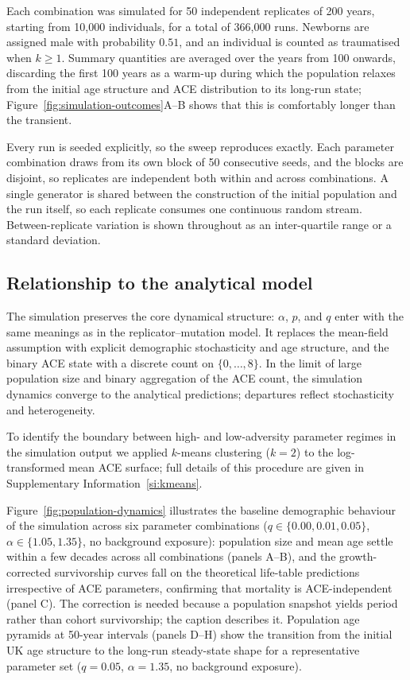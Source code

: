 \documentclass{article}
\begin{document}
Each combination was simulated for 50 independent replicates of 200 years,
starting from 10{,}000 individuals, for a total of 366{,}000 runs.  Newborns are
assigned male with probability \(0.51\), and an individual is counted as
traumatised when \(k \geq 1\).  Summary quantities are averaged over the years
from 100 onwards, discarding the first 100 years as a warm-up during which the
population relaxes from the initial age structure and ACE distribution to its
long-run state; Figure~\ref{fig:simulation-outcomes}A--B shows that
this is comfortably longer than the transient.

Every run is seeded explicitly, so the sweep reproduces exactly.  Each
parameter combination draws from its own block of 50 consecutive seeds, and the
blocks are disjoint, so replicates are independent both within and across
combinations.  A single generator is shared between the construction of the
initial population and the run itself, so each replicate consumes one
continuous random stream.  Between-replicate variation is shown throughout as
an inter-quartile range or a standard deviation.

\subsection*{Relationship to the analytical model}

The simulation preserves the core dynamical structure: \(\alpha\), \(p\), and
\(q\) enter with the same meanings as in the replicator--mutation model. It
replaces the mean-field assumption with explicit demographic stochasticity and
age structure, and the binary ACE state with a discrete count on
\(\{0, \dots, 8\}\).  In the limit of large population size and binary
aggregation of the ACE count, the simulation dynamics converge to the analytical
predictions; departures reflect stochasticity and heterogeneity.

To identify the boundary between high- and low-adversity parameter regimes in
the simulation output we applied \(k\)-means clustering (\(k=2\)) to the
log-transformed mean ACE surface; full details of this procedure are given in
Supplementary Information~\ref{si:kmeans}.

Figure~\ref{fig:population-dynamics} illustrates the baseline demographic
behaviour of the simulation across six parameter combinations
(\(q \in \{0.00, 0.01, 0.05\}\), \(\alpha \in \{1.05, 1.35\}\), no background
exposure): population size and mean age settle within a few decades across all
combinations (panels A--B), and the growth-corrected survivorship curves fall
on the theoretical life-table predictions irrespective of ACE parameters,
confirming that mortality is ACE-independent (panel C).  The correction is
needed because a population snapshot yields period rather than cohort
survivorship; the caption describes it.  Population age pyramids at 50-year intervals
(panels D--H) show the transition from the initial UK age structure to the
long-run steady-state shape for a representative parameter set
(\(q = 0.05\), \(\alpha = 1.35\), no background exposure).
\end{document}
